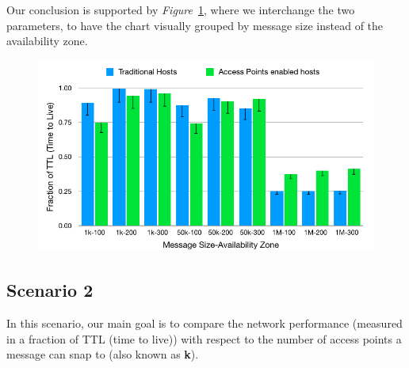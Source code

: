 {Our conclusion is supported by \emph{Figure}~\ref{fig:scenario1_message_size_availability_zone_2}, where we interchange the two parameters, to have the chart visually grouped by message size instead of the availability zone.
\begin{figure}[H]
  \centering
  \includegraphics[scale=0.55]{./figures/scenario1_message_size_availability_zone_2}
  \label{fig:scenario1_message_size_availability_zone_2}
\end{figure}
\subsection{Scenario 2}
In this scenario, our main goal is to compare the network performance (measured in a fraction of TTL (time to live)) with respect to the number of access points a message can snap to (also known as \textbf{k}).
}
